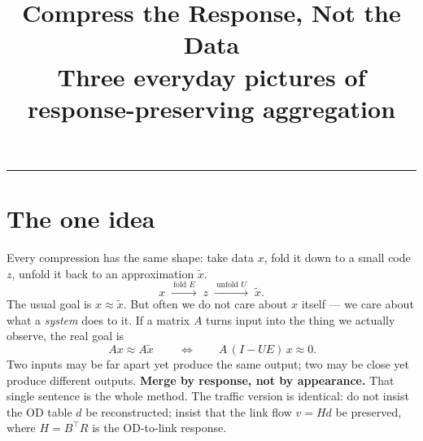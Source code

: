 \documentclass[11pt]{article}
\title{\textbf{Compress the Response, Not the Data}\\[2pt]
\large Three everyday pictures of response-preserving aggregation}
\author{}
\date{}
\begin{document}
\maketitle
\vspace{-3.2em}

\begin{center}\rule{0.5\textwidth}{0.4pt}\end{center}

\section*{The one idea}

Every compression has the same shape: take data $x$, fold it down to a small
code $z$, unfold it back to an approximation $\tilde x$.
\[
x \;\xrightarrow{\ \text{fold }E\ }\; z \;\xrightarrow{\ \text{unfold }U\ }\; \tilde x .
\]
The usual goal is $x \approx \tilde x$. But often we do not care about $x$
itself --- we care about what a \emph{system} does to it. If a matrix $A$ turns
input into the thing we actually observe, the real goal is
\[
\boxed{\,A x \approx A\tilde x\,}
\qquad\Longleftrightarrow\qquad
A\,(I - UE)\,x \approx 0 .
\]
Two inputs may be far apart yet produce the same output; two may be close yet
produce different outputs. \textbf{Merge by response, not by appearance.} That
single sentence is the whole method. The traffic version is identical: do not
insist the OD table $d$ be reconstructed; insist that the link flow
$v = Hd$ be preserved, where $H = B^{\!\top}R$ is the OD-to-link response.

\begin{center}
\end{center}
\end{document}
